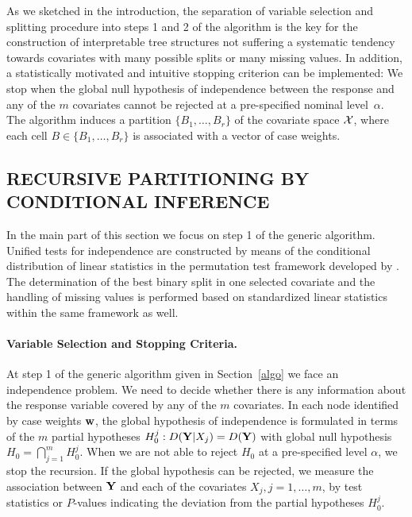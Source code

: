 As we sketched in the introduction, the separation of variable
selection and splitting procedure into steps 1 and 2 of the algorithm
is the key for the construction of interpretable tree
structures not suffering a systematic tendency towards covariates with many
possible splits or many missing values. In addition, a statistically
motivated and intuitive stopping criterion can be implemented: We stop 
when the global null hypothesis of independence between the
response and any of the $m$ covariates cannot be rejected at a pre-specified
nominal level~$\alpha$. The algorithm induces a partition $\{B_1, \dots, B_r\}$ of
the covariate space $\mathcal{X}$, where each cell $B \in \{B_1, \dots, B_r\}$ 
is associated with a vector of case weights. 

\begin{center}
\section{RECURSIVE PARTITIONING BY CONDITIONAL INFERENCE \label{framework}}
\end{center}

In the main part of this section we focus on step 1 of the generic algorithm.
Unified tests for independence are constructed by means of the conditional
distribution of linear statistics in the permutation test framework
developed by \cite{StrasserWeber1999}. The determination of the best binary split
in one selected covariate and the handling of missing values
is performed based on standardized linear statistics within the same
framework as well. 

\paragraph{Variable Selection and Stopping Criteria.}
At step 1 of the generic algorithm given in Section~\ref{algo} we face an 
independence problem. We need to decide whether there is any information
about the response variable covered by any of the $m$  covariates. In each node
identified by case weights $\mathbf{w}$, the
global hypothesis of independence is formulated in terms of the $m$ partial hypotheses
$H_0^j: D(\mathbf{Y} | X_j) = D(\mathbf{Y})$ with global null hypothesis $H_0 = \bigcap_{j = 1}^m
H_0^j$.
When we are not able to reject $H_0$ at a pre-specified 
level $\alpha$, we stop the recursion.
If the global hypothesis can be rejected, we measure the association
between $\mathbf{Y}$ and each of the covariates $X_j, j = 1, \dots, m$, by
test statistics or $P$-values indicating the deviation from the partial
hypotheses $H_0^j$.  

